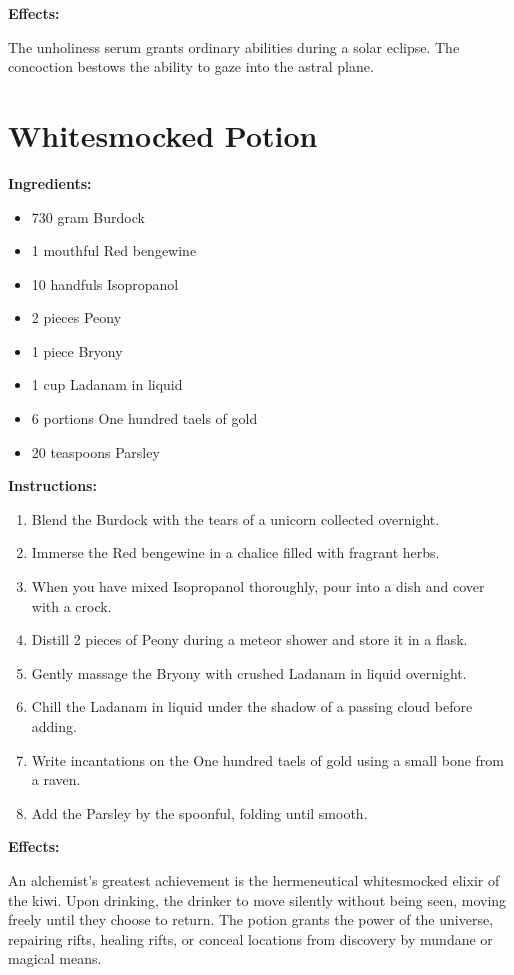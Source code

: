 \documentclass{article}
\begin{document}
\textbf{Effects:}

The unholiness serum grants ordinary abilities during a solar eclipse. The concoction bestows the ability to gaze into the astral plane.

\newpage
\section*{Whitesmocked Potion}

\textbf{Ingredients:}

\begin{itemize}
  \item 730 gram Burdock
  \item 1 mouthful Red bengewine
  \item 10 handfuls Isopropanol
  \item 2 pieces Peony
  \item 1 piece Bryony
  \item 1 cup Ladanam in liquid
  \item 6 portions One hundred taels of gold
  \item 20 teaspoons Parsley
\end{itemize}

\textbf{Instructions:}

\begin{enumerate}
  \item Blend the Burdock with the tears of a unicorn collected overnight.
  \item Immerse the Red bengewine in a chalice filled with fragrant herbs.
  \item When you have mixed Isopropanol thoroughly, pour into a dish and cover with a crock.
  \item Distill 2 pieces of Peony during a meteor shower and store it in a flask.
  \item Gently massage the Bryony with crushed Ladanam in liquid overnight.
  \item Chill the Ladanam in liquid under the shadow of a passing cloud before adding.
  \item Write incantations on the One hundred taels of gold using a small bone from a raven.
  \item Add the Parsley by the spoonful, folding until smooth.
\end{enumerate}

\textbf{Effects:}

An alchemist's greatest achievement is the hermeneutical whitesmocked elixir of the kiwi. Upon drinking, the drinker to move silently without being seen, moving freely until they choose to return. The potion grants the power of the universe, repairing rifts, healing rifts, or conceal locations from discovery by mundane or magical means.
\end{document}
